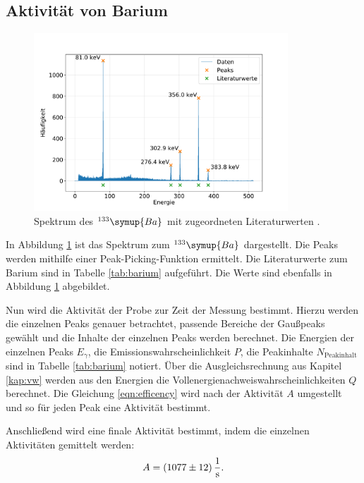 \subsection{Aktivität von Barium}
\begin{figure}[h!]
  \centering
  \includegraphics[width=0.85\textwidth]{content/images/barium_markiert.pdf}
  \caption{Spektrum des $^{133}\symup{Ba}$ mit zugeordneten Literaturwerten \cite{nucleide}.}
  \label{fig:ba_spectrum}
\end{figure}
In Abbildung \ref{fig:ba_spectrum} ist das Spektrum zum $^{133}\symup{Ba}$ dargestellt.
Die Peaks werden mithilfe einer Peak-Picking-Funktion ermittelt.
Die Literaturwerte zum Barium \cite{nucleide} sind in Tabelle \ref{tab:barium} aufgeführt.
Die Werte sind ebenfalls in Abbildung \ref{fig:ba_spectrum} abgebildet.
\FloatBarrier

Nun wird die Aktivität der Probe zur Zeit der Messung bestimmt.
Hierzu werden die einzelnen Peaks genauer betrachtet, passende Bereiche der Gaußpeaks gewählt und die Inhalte der einzelnen Peaks werden berechnet.
Die Energien der einzelnen Peaks $E_{\gamma}$, die Emissionswahrscheinlichkeit $P$, die Peakinhalte $N_{\text{Peakinhalt}}$ sind in Tabelle \ref{tab:barium} notiert.
Über die Ausgleichsrechnung aus Kapitel \ref{kap:vw} werden aus den Energien die Vollenergienachweiswahrscheinlichkeiten $Q$ berechnet.
Die Gleichung \eqref{eqn:efficency} wird nach der Aktivität $A$ umgestellt und so für jeden Peak eine Aktivität bestimmt.

Anschließend wird eine finale Aktivität bestimmt, indem die einzelnen Aktivitäten gemittelt werden:
\begin{equation*}
    A = \SI{1077 (12)}{\frac{1}{s}}.
\end{equation*}
\FloatBarrier

